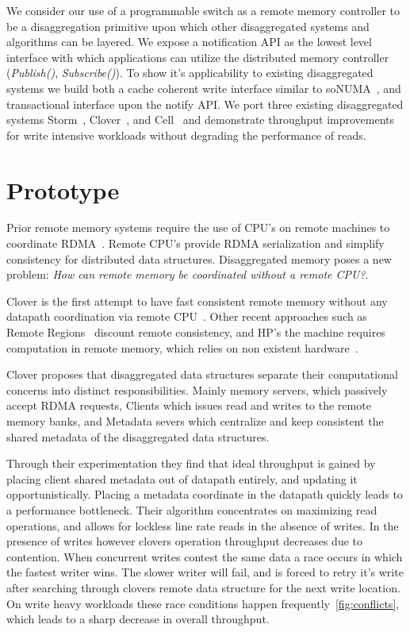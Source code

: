 We consider our use of a programmable switch as a remote memory
controller to be a disaggregation primitive upon which other
disaggregated systems and algorithms can be layered. We expose a
notification API as the lowest level interface with which applications
can utilize the distributed memory controller (\textit{Publish()},
\textit{Subscribe()}). To show it's applicability to existing
disaggregated systems we build both a cache coherent write interface
similar to soNUMA~\cite{sonuma}, and transactional interface upon the
notify API. We port three existing disaggregated systems
Storm~\cite{storm}, Clover~\cite{clover}, and Cell~\cite{cell} and
demonstrate throughput improvements for write intensive workloads
without degrading the performance of reads.


\section{Prototype}
Prior remote memory systems require the use of CPU's on remote
machines to coordinate RDMA~\cite{cell,sonuma,storm,erpc,farm}. Remote
CPU's provide RDMA serialization and simplify consistency for
distributed data structures. Disaggregated memory poses a new problem:
\textit{How can remote memory be coordinated without a remote CPU?}.

Clover is the first attempt to have fast consistent remote memory
without any datapath coordination via remote CPU~\cite{clover}. Other
recent approaches such as Remote Regions~\cite{reigons} discount
remote consistency, and HP's the machine requires computation in
remote memory, which relies on non existent
hardware~\cite{aguilera2019designing}.

Clover proposes that disaggregated data structures separate their
computational concerns into distinct responsibilities. Mainly memory
servers, which passively accept RDMA requests, Clients which issues read and
writes to the remote memory banks, and Metadata severs which
centralize and keep consistent the shared metadata of the disaggregated
data structures.

Through their experimentation they find that ideal throughput is
gained by placing client shared metadata out of datapath entirely, and
updating it opportunistically. Placing a metadata coordinate in the
datapath quickly leads to a performance bottleneck. Their algorithm
concentrates on maximizing read operations, and allows for lockless
line rate reads in the absence of writes. In the presence of writes
however clovers operation throughput decreases due to contention. When
concurrent writes contest the same data a race occurs in which the
fastest writer wins. The slower writer will fail, and is forced to
retry it's write after searching through clovers remote data structure
for the next write location. On write heavy workloads these race
conditions happen frequently~\ref{fig:conflicts}, which leads to a
sharp decrease in overall throughput.


